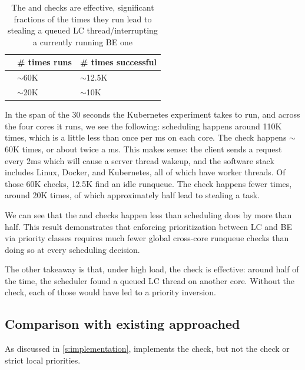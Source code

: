\begin{table}[t]
    \centering
    \begin{tabular}{|l|l|l|}
        \hline
                & \# times runs & \# times successful \\ \hline
        \entry{} & $\sim$60K    & $\sim$12.5K         \\ \hline
        \exit{}  & $\sim$20K    & $\sim$10K          \\ \hline
    \end{tabular}
    \vspace{10pt}
    \caption{The \exit{} and \entry{} checks are effective, significant
    fractions of the times they run lead to stealing a queued LC
    thread/interrupting a currently running BE one}\label{tab:check-counts}
\end{table}

In the span of the 30 seconds the Kubernetes experiment takes to run, and across
the four cores it runs, we see the following: scheduling happens around 110K
times, which is a little less than once per ms on each core. The \entry{} check
happens $\sim$60K times, or about twice a ms. This makes sense: the client sends
a request every 2ms which will cause a server thread wakeup, and the software
stack includes Linux, Docker, and Kubernetes, all of which have worker threads.
Of those 60K \entry{} checks, 12.5K find an idle runqueue. The \exit{} check
happens fewer times, around 20K times, of which approximately half lead to
stealing a \schednormal{} task.

We can see that the \entry{} and \exit{} checks happen less than scheduling does
by more than half. This result demonstrates that enforcing prioritization
between LC and BE via priority classes requires much fewer global cross-core
runqueue checks than doing so at every scheduling decision.

The other takeaway is that, under high load, the \exit{} check is effective:
around half of the time, the scheduler found a queued LC thread on another core.
Without the check, each of those would have led to a priority inversion.


\subsection{Comparison with existing approached}\label{ss:eval:cmp}

As discussed in \autoref{s:implementation}, \schedidle{} implements the \entry{}
check, but not the \exit{} check or strict local priorities.

